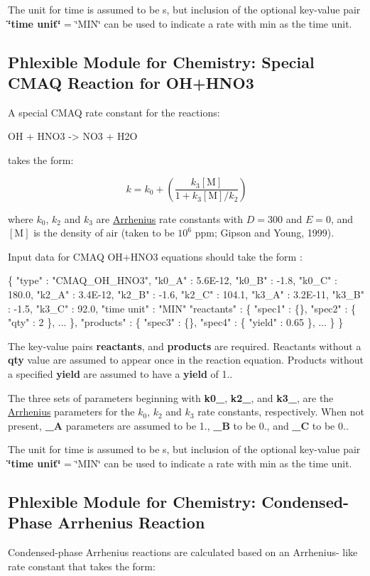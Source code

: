 The unit for time is assumed to be s, but inclusion of the optional key-\/value pair {\bfseries \char`\"{}time unit\char`\"{}} = \char`\"{}\+M\+I\+N\char`\"{} can be used to indicate a rate with min as the time unit. \hypertarget{phlex_rxn_CMAQ_OH_HNO3}{}\subsection{Phlexible Module for Chemistry\+: Special C\+M\+AQ Reaction for O\+H+\+H\+N\+O3}\label{phlex_rxn_CMAQ_OH_HNO3}
A special C\+M\+AQ rate constant for the reactions\+:

\begin{ch} OH + HNO3 -> NO3 + H2O \end{ch}

takes the form\+:

\[ k=k_0+(\frac{k_3[\mbox{M}]}{1+k_3[\mbox{M}]/k_2}) \]

where $k_0$, $k_2$ and $k_3$ are \mbox{\hyperlink{phlex_rxn_arrhenius}{Arrhenius}} rate constants with $D=300$ and $E=0$, and $[\mbox{M}]$ is the density of air (taken to be $10^6$ ppm; Gipson and Young, 1999).

Input data for C\+M\+AQ O\+H+\+H\+N\+O3 equations should take the form \+: 
\begin{DoxyCode}
\{
  "type" : "CMAQ\_OH\_HNO3",
  "k0\_A" : 5.6E-12,
  "k0\_B" : -1.8,
  "k0\_C" : 180.0,
  "k2\_A" : 3.4E-12,
  "k2\_B" : -1.6,
  "k2\_C" : 104.1,
  "k3\_A" : 3.2E-11,
  "k3\_B" : -1.5,
  "k3\_C" : 92.0,
  "time unit" : "MIN"
  "reactants" : \{
    "spec1" : \{\},
    "spec2" : \{ "qty" : 2 \},
    ...
  \},
  "products" : \{
    "spec3" : \{\},
    "spec4" : \{ "yield" : 0.65 \},
    ...
  \}
\}
\end{DoxyCode}
 The key-\/value pairs {\bfseries reactants}, and {\bfseries products} are required. Reactants without a {\bfseries qty} value are assumed to appear once in the reaction equation. Products without a specified {\bfseries yield} are assumed to have a {\bfseries yield} of 1..

The three sets of parameters beginning with {\bfseries k0\+\_\+}, {\bfseries k2\+\_\+}, and {\bfseries k3\+\_\+}, are the \mbox{\hyperlink{phlex_rxn_arrhenius}{Arrhenius}} parameters for the $k_0$, $k_2$ and $k_3$ rate constants, respectively. When not present, {\bfseries \+\_\+A} parameters are assumed to be 1., {\bfseries \+\_\+B} to be 0., and {\bfseries \+\_\+C} to be 0..

The unit for time is assumed to be s, but inclusion of the optional key-\/value pair {\bfseries \char`\"{}time unit\char`\"{}} = \char`\"{}\+M\+I\+N\char`\"{} can be used to indicate a rate with min as the time unit. \hypertarget{phlex_rxn_condensed_phase_arrhenius}{}\subsection{Phlexible Module for Chemistry\+: Condensed-\/\+Phase Arrhenius Reaction}\label{phlex_rxn_condensed_phase_arrhenius}
Condensed-\/phase Arrhenius reactions are calculated based on an Arrhenius-\/ like rate constant that takes the form\+:

